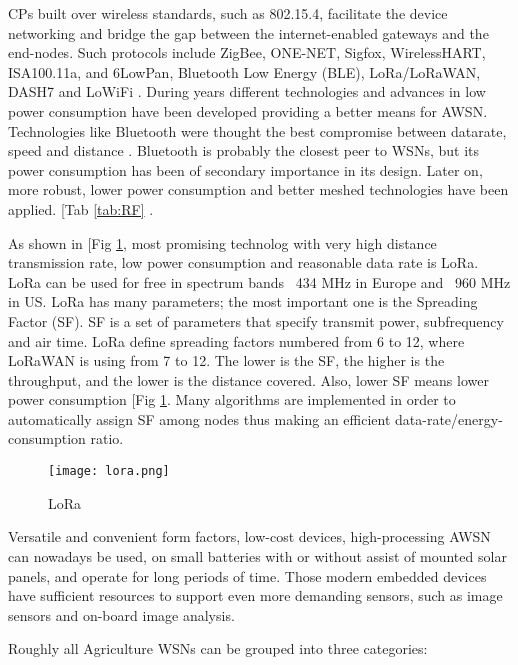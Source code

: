 \documentclass[review]{elsarticle}
\begin{document}
    CPs built over wireless standards, such as 802.15.4, facilitate the device networking and bridge the gap between the internet-enabled gateways and the end-nodes. Such protocols include ZigBee, ONE-NET, Sigfox, WirelessHART, ISA100.11a, and 6LowPan, Bluetooth Low Energy (BLE), LoRa/LoRaWAN, DASH7 and LoWiFi \cite{Tzounis_2017}. During years different technologies and advances in low power consumption have been developed providing a better means for AWSN. Technologies like Bluetooth were thought the best compromise between datarate, speed and distance \cite{Vuran_2018, Choudhury_2015}. Bluetooth is probably the closest peer to WSNs, but its power consumption has been of secondary importance in its design. Later on, more robust, lower power consumption and better meshed technologies have been applied. [Tab \ref{tab:RF} \cite{Aqeel_ur_Rehman_2014, Wang_2013}. 

    As shown in [Fig \ref{fig:LoRa}, most promising technolog with very high distance transmission rate, low power consumption and reasonable data rate is LoRa. LoRa can be used for free in spectrum bands ~434 MHz in Europe and ~960 MHz in US. LoRa has many parameters; the most important one is the Spreading Factor (SF). SF is a set of parameters that specify transmit power, subfrequency and air time. LoRa define spreading factors numbered from 6 to 12, where LoRaWAN is using from 7 to 12. The lower is the SF, the higher is the throughput, and the lower is the distance covered. Also, lower SF means lower power consumption [Fig \ref{fig:LoRa}. Many algorithms are implemented in order to automatically assign SF among nodes thus making an efficient data-rate/energy-consumption ratio.
        
    \begin{figure}[thpb]
        \centering
        \texttt{[image: lora.png]}
        \caption{LoRa}
        \label{fig:LoRa}
    \end{figure}
        
    Versatile and convenient form factors, low-cost devices, high-processing AWSN can nowadays be used, on small batteries with or without assist of mounted solar panels, and operate for long periods of time. Those modern embedded devices have sufficient resources to support even more demanding sensors, such as image sensors and on-board image analysis.
        
    Roughly all Agriculture WSNs can be grouped into three categories:
        
\end{document}
